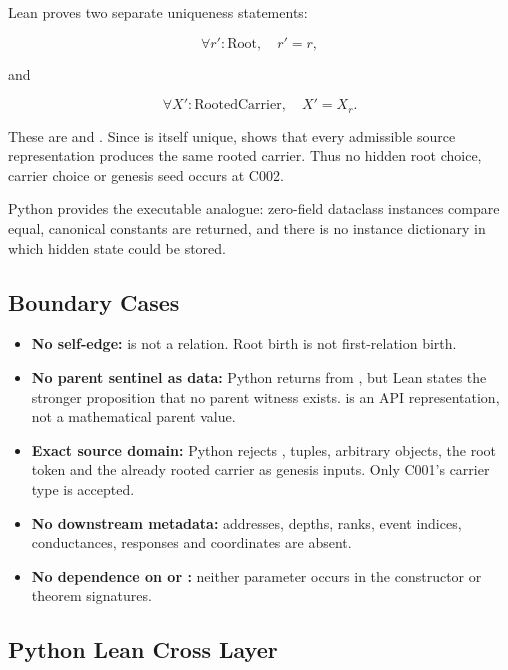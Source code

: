 Lean proves two separate uniqueness statements:

\[
\forall r':\mathrm{Root},\quad r'=r,
\]

and

\[
\forall X':\mathrm{RootedCarrier},\quad X'=X_r.
\]

These are \texttt{\protect{}} and
\texttt{\protect{}}. Since \texttt{\protect{}} is
itself unique, \texttt{\protect{}} shows that every
admissible source representation produces the same rooted carrier. Thus
no hidden root choice, carrier choice or genesis seed occurs at C002.

Python provides the executable analogue: zero-field dataclass instances
compare equal, canonical constants are returned, and there is no
instance dictionary in which hidden state could be stored.

\subsection{Boundary Cases}\label{boundary-cases}

\begin{itemize}
\tightlist
\item
  \textbf{No self-edge:} \texttt{\protect{}} is not a relation. Root birth is
  not first-relation birth.
\item
  \textbf{No parent sentinel as data:} Python returns \texttt{\protect{}} from
  \texttt{\protect{}}, but Lean states the stronger proposition
  that no parent witness exists. \texttt{\protect{}} is an API representation,
  not a mathematical parent value.
\item
  \textbf{Exact source domain:} Python rejects \texttt{\protect{}}, tuples,
  arbitrary objects, the root token and the already rooted carrier as
  genesis inputs. Only C001's carrier type is accepted.
\item
  \textbf{No downstream metadata:} addresses, depths, ranks, event
  indices, conductances, responses and coordinates are absent.
\item
  \textbf{No dependence on \texttt{\protect{}} or \texttt{\protect{}}:} neither parameter
  occurs in the constructor or theorem signatures.
\end{itemize}

\subsection{Python Lean Cross Layer}\label{python-lean-cross-layer}

